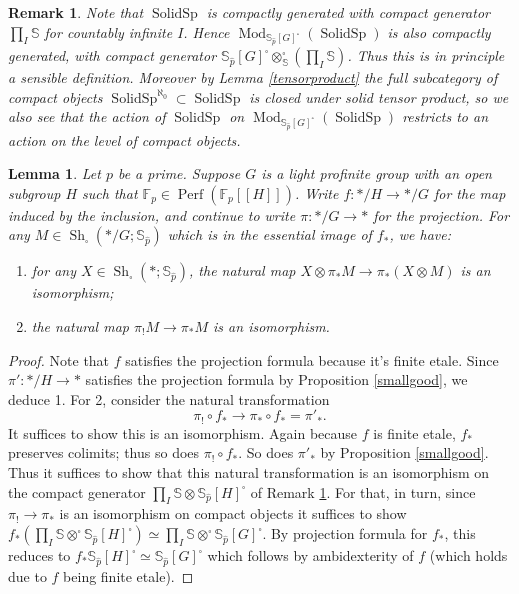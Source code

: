 \documentclass[12pt]{article}
\newtheorem{lemma}[theorem]{Lemma}
\newtheorem{remark}[theorem]{Remark}
\newcommand{\on}{\operatorname}
\newcommand{\mbb}{\mathbb}
\newcommand{\solid}{\square}
\newcommand{\wh}{\widehat}
\begin{document}
\begin{remark}\label{compactlygenerated}
Note that $\on{SolidSp}$ is compactly generated with compact generator $\prod_I \mathbb{S}$ for countably infinite $I$. Hence $\on{Mod}_{\mbb{S}_{\wh{p}}[G]^\solid}(\on{SolidSp})$ is also compactly generated, with compact generator $\mbb{S}_{\wh{p}}[G]^\solid\otimes^\solid_{\mbb{S}}(\prod_I \mathbb{S})$.  Thus this is in principle a sensible definition.  Moreover by Lemma \ref{tensorproduct} the full subcategory of compact objects $\on{SolidSp}^{\aleph_0}\subset\on{SolidSp}$ is closed under solid tensor product, so we also see that the action of $\on{SolidSp}$ on $\on{Mod}_{\mbb{S}_{\wh{p}}[G]^\solid}(\on{SolidSp})$ restricts to an action on the level of compact objects.\end{remark}

\begin{lemma}\label{handleonlowershriek}
Let $p$ be a prime.  Suppose $G$ is a light profinite group with an open subgroup $H$ such that $\mathbb{F}_p\in \on{Perf}(\mathbb{F}_p[[H]])$.  Write $f:\ast/H\to\ast/G$ for the map induced by the inclusion, and continue to write $\pi:\ast/G\to\ast$ for the projection.  For any $M\in\on{Sh}_\square(\ast/G;\mbb{S}_{\wh{p}})$ which is in the essential image of $f_\ast$, we have:
\begin{enumerate}
\item for any $X\in\on{Sh}_\square(\ast;\mbb{S}_{\wh{p}})$, the natural map $X\otimes \pi_\ast M\to\pi_\ast(X\otimes M)$ is an isomorphism;
\item the natural map $\pi_! M\to\pi_\ast M$ is an isomorphism.
\end{enumerate}
\end{lemma}
\begin{proof}
Note that $f$ satisfies the projection formula because it's finite etale.  Since $\pi':\ast/H\to\ast$ satisfies the projection formula by Proposition \ref{smallgood}, we deduce 1.  For 2, consider the natural transformation
$$\pi_!\circ f_\ast \to \pi_\ast \circ f_\ast = \pi'_\ast.$$
It suffices to show this is an isomorphism.  Again because $f$ is finite etale, $f_\ast$ preserves colimits; thus so does $\pi_!\circ f_\ast$.  So does $\pi'_\ast$ by Proposition \ref{smallgood}.  Thus it suffices to show that this natural transformation is an isomorphism on the compact generator $\prod_I\mathbb{S}\otimes\mbb{S}_{\wh{p}}[H]^\solid$ of Remark \ref{compactlygenerated}.  For that, in turn, since $\pi_!\to\pi_\ast$ is an isomorphism on compact objects it suffices to show $f_\ast (\prod_I\mathbb{S}\otimes^\solid\mbb{S}_{\wh{p}}[H]^\solid)\simeq \prod_I\mathbb{S}\otimes^\solid\mbb{S}_{\wh{p}}[G]^\solid$.  By projection formula for $f_\ast$, this reduces to $f_\ast\mbb{S}_{\wh{p}}[H]^\solid\simeq \mbb{S}_{\wh{p}}[G]^\solid$ which follows by ambidexterity of $f$ (which holds due to $f$ being finite etale).
\end{proof}
\end{document}
